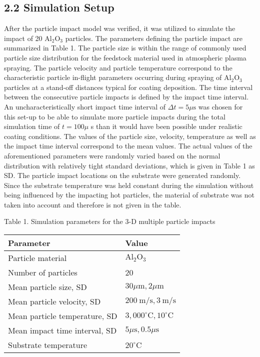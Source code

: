 \documentclass[10pt]{article}
\begin{document}
\subsection*{2.2 Simulation Setup}
After the particle impact model was verified, it was utilized to simulate the impact of 20 $\mathrm{Al}_{2} \mathrm{O}_{3}$ particles. The parameters defining the particle impact are summarized in Table 1. The particle size is within the range of commonly used particle size distribution for the feedstock material used in atmospheric plasma spraying. The particle velocity and particle temperature correspond to the characteristic particle in-flight parameters occurring during spraying of $\mathrm{Al}_{2} \mathrm{O}_{3}$ particles at a stand-off distances typical for coating deposition. The time interval between the consecutive particle impacts is defined by the impact time interval. An uncharacteristically short impact time interval of $\Delta t=5 \mu \mathrm{s}$ was chosen for this set-up to be able to simulate more particle impacts during the total simulation time of $t=100 \mu$ s than it would have been possible under realistic coating conditions. The values of the particle size, velocity, temperature as well as the impact time interval correspond to the mean values. The actual values of the aforementioned parameters were randomly varied based on the normal distribution with relatively tight standard deviations, which is given in Table 1 as SD. The particle impact locations on the substrate were generated randomly. Since the substrate temperature was held constant during the simulation without being influenced by the impacting hot particles, the material of substrate was not taken into account and therefore is not given in the table.

Table 1. Simulation parameters for the 3-D multiple particle impacts

\begin{center}
\begin{tabular}{l|l}
\hline
Parameter & Value \\
\hline
Particle material & $\mathrm{Al}_{2} \mathrm{O}_{3}$ \\
\hline
Number of particles & 20 \\
\hline
Mean particle size, SD & $30 \mu \mathrm{m}, 2 \mu \mathrm{m}$ \\
\hline
Mean particle velocity, SD & $200 \mathrm{~m} / \mathrm{s}, 3 \mathrm{~m} / \mathrm{s}$ \\
\hline
Mean particle temperature, SD & $3,000^{\circ} \mathrm{C}, 10^{\circ} \mathrm{C}$ \\
\hline
Mean impact time interval, SD & $5 \mu \mathrm{s}, 0.5 \mu \mathrm{s}$ \\
\hline
Substrate temperature & $20^{\circ} \mathrm{C}$ \\
\hline
\end{tabular}
\end{center}
\end{document}

